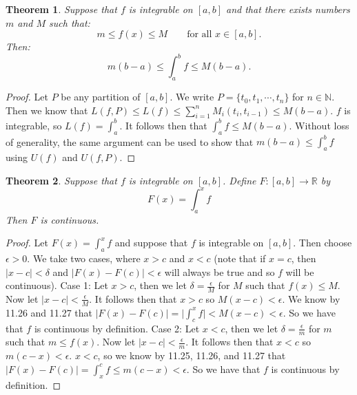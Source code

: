 \documentclass[12pt]{article}
\newcommand{\bbN}{\mathbb{N}}
\newcommand{\bbR}{\mathbb{R}}
\providecommand{\abs}[1]{\lvert #1 \rvert}
\providecommand{\arr}{\longrightarrow}
\renewcommand{\_}[1]{\underline{ #1 }}
\newtheorem{theorem}{Theorem}[section]
\theoremstyle{definition}
\numberwithin{equation}{subsection}
\begin{document}
\begin{theorem}  Suppose that $f$ is integrable on $[a, b]$ and that there exists numbers $m$ and $M$ such that:
\[
m \leq f(x) \leq M \qquad \text{for all $x \in [a, b]$.}
\]
Then:
\[
m (b - a) \leq \int_{a}^{b} f \leq M(b - a).
\]
\end{theorem}

\begin{proof}
Let $P$ be any partition of $[a,b]$. We write $P = \{t_0, t_1, \dotsm, t_n\}$ for $n \in \bbN$. Then we know that $L(f,P) \leq L(f) \leq \sum_{i=1}^n M_i(t_i, t_{i-1}) \leq M(b - a)$. $f$ is integrable, so $L(f) = \int_{a}^{b}$. It follows then that $\int_{a}^{b} f \leq M(b-a)$. Without loss of generality, the same argument can be used to show that $m(b-a) \leq \int_{a}^{b} f$ using $U(f)$ and $U(f,P)$.
\end{proof}

\begin{theorem}  Suppose that $f$ is integrable on $[a, b]$.  Define  $F \colon [a, b] \arr \bbR$ by
\[
F(x) = \int_{a}^{x} f 
\]
Then $F$ is continuous.
\end{theorem}

\begin{proof}
Let $F(x) = \int_{a}^{x} f$ and suppose that $f$ is integrable on $[a,b]$. Then choose $\epsilon > 0$. We take two cases, where $x > c$ and $x < c$ (note that if $x = c$, then $\abs{x - c} < \delta$ and $\abs{F(x) - F(c)} < \epsilon$ will always be true and so $f$ will be continuous). \newline
Case 1: Let $x > c$, then we let $\delta = \frac{\epsilon}{M}$ for $M$ such that $f(x) \leq M$. Now let $\abs{x - c} < \frac{\epsilon}{M}$. It follows then that $x > c$ so $M(x-c) < \epsilon$. We know by 11.26 and 11.27 that $\abs{F(x) - F(c)} = \abs{\int_{c}^{x} f} < M(x-c) < \epsilon$. So we have that $f$ is continuous by definition. \newline
Case 2: Let $x < c$, then we let $\delta = \frac{\epsilon}{m}$ for $m$ such that $m \leq f(x)$. Now let $\abs{x - c} < \frac{\epsilon}{m}$. It follows then that $x < c$ so $m(c-x) < \epsilon$. $x < c$, so we know by 11.25, 11.26, and 11.27 that $\abs{F(x) - F(c)} = \int_{x}^{c} f \leq m(c - x) < \epsilon$. So we have that $f$ is continuous by definition.
\end{proof}
\end{document}
